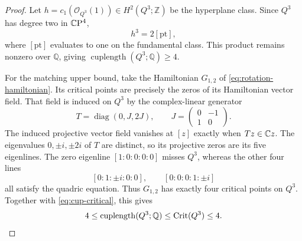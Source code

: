 \begin{proof}
Let $h=c_1(\mathcal O_{Q^3}(1))\in H^2(Q^3;\mathbb Z)$ be the
hyperplane class. Since $Q^3$ has degree two in $\mathbb C\mathrm P^4$,
\[
 h^3=2[\mathrm{pt}],
\]
where $[\mathrm{pt}]$ evaluates to one on the fundamental class.
This product remains nonzero over $\mathbb Q$, giving
$\operatorname{cuplength}(Q^3;\mathbb Q)\ge4$.

For the matching upper bound, take the Hamiltonian $G_{1,2}$ of
\eqref{eq:rotation-hamiltonian}. Its critical points are precisely the
zeros of its Hamiltonian vector field. That field is induced on $Q^3$
by the complex-linear generator
\[
 T=\operatorname{diag}(0,J,2J),
 \qquad J=\begin{pmatrix}0&-1\\1&0\end{pmatrix}.
\]
The induced projective vector field vanishes at $[z]$ exactly when
$Tz\in\mathbb C z$. The eigenvalues $0,\pm i,\pm2i$ of $T$ are distinct,
so its projective zeros are its five eigenlines. The zero eigenline
$[1:0:0:0:0]$ misses $Q^3$, whereas the other four lines
\[
 [0:1:\pm i:0:0],\qquad [0:0:0:1:\pm i]
\]
all satisfy the quadric equation. Thus $G_{1,2}$ has exactly four
critical points on $Q^3$. Together with \eqref{eq:cup-critical}, this gives
\[
 4\le\operatorname{cuplength}(Q^3;\mathbb Q)
   \le\operatorname{Crit}(Q^3)\le4.
\]
\end{proof}
